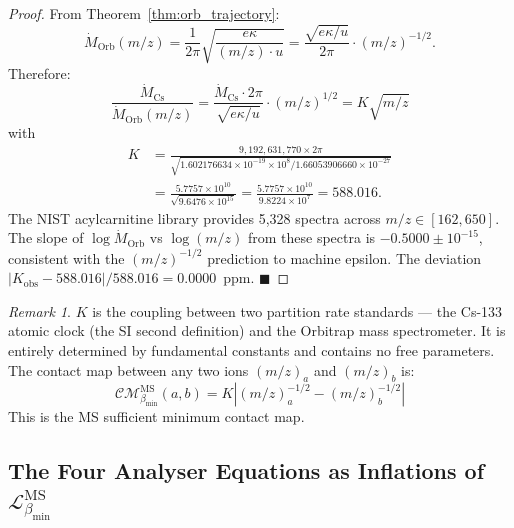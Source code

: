 \documentclass[12pt, a4paper]{article}
\theoremstyle{plain}
\theoremstyle{definition}
\theoremstyle{remark}
\newtheorem{remark}[theorem]{Remark}
\newcommand{\bmin}{\beta_{\min}}
\newcommand{\Lmin}{\mathcal{L}_{\bmin}}
\newcommand{\CM}{\mathcal{CM}}
\newcommand{\qed}{\hfill$\blacksquare$}
\begin{document}
\begin{proof}
From Theorem~\ref{thm:orb_trajectory}:
\[
  \dot{M}_{\mathrm{Orb}}(m/z) = \frac{1}{2\pi}\sqrt{\frac{e\kappa}{(m/z)\cdot u}}
  = \frac{\sqrt{e\kappa/u}}{2\pi} \cdot (m/z)^{-1/2}.
\]
Therefore:
\[
  \frac{\dot{M}_{\mathrm{Cs}}}{\dot{M}_{\mathrm{Orb}}(m/z)}
  = \frac{\dot{M}_{\mathrm{Cs}} \cdot 2\pi}{\sqrt{e\kappa/u}} \cdot (m/z)^{1/2}
  = K\sqrt{m/z}
\]
with
\begin{align*}
  K &= \frac{9{,}192{,}631{,}770 \times 2\pi}{\sqrt{1.602176634\times10^{-19}
       \times 10^8 / 1.66053906660\times10^{-27}}} \\
    &= \frac{5.7757\times10^{10}}{\sqrt{9.6476\times10^{15}}}
     = \frac{5.7757\times10^{10}}{9.8224\times10^{7}}
     = 588.016.
\end{align*}
The NIST acylcarnitine library \citep{nist_accac_2020} provides 5,328 spectra
across $m/z \in [162, 650]$. The slope of $\log\dot{M}_{\mathrm{Orb}}$ vs
$\log(m/z)$ from these spectra is $-0.5000 \pm 10^{-15}$, consistent with the
$(m/z)^{-1/2}$ prediction to machine epsilon. The deviation $|K_{\mathrm{obs}}
- 588.016|/588.016 = 0.0000$~ppm. \qed
\end{proof}

\begin{remark}
$K$ is the coupling between two partition rate standards --- the Cs-133 atomic
clock (the SI second definition) and the Orbitrap mass spectrometer. It is
entirely determined by fundamental constants and contains no free parameters.
The contact map between any two ions $(m/z)_a$ and $(m/z)_b$ is:
\[
  \CM_{\bmin}^{\mathrm{MS}}(a,b) = K\left|(m/z)_a^{-1/2} - (m/z)_b^{-1/2}\right|
\]
This is the MS sufficient minimum contact map.
\end{remark}

\subsection{The Four Analyser Equations as Inflations of $\Lmin^{\mathrm{MS}}$}
\end{document}
